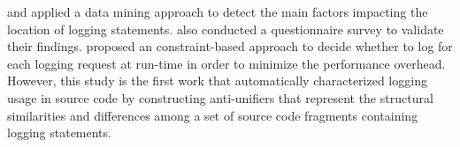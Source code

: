 \citet{fu2014developers} and \citet{zhu2015learning} applied a data mining approach to detect the main factors impacting the location of logging statements. \citet{fu2014developers} also conducted a questionnaire survey to validate their findings. \citet{ding2015log2} proposed an constraint-based approach to decide whether to log for each logging request at run-time in order to minimize the performance overhead. However, this study is the first work that automatically characterized logging usage in source code by constructing anti-unifiers that represent the structural similarities and differences among a set of source code fragments containing logging statements. 










